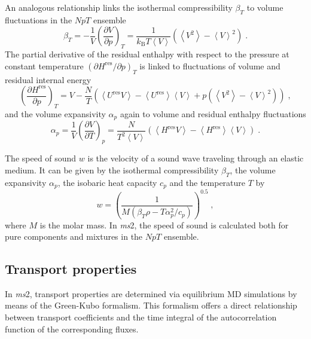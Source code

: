 An analogous relationship links the isothermal compressibility $\beta_{T}$ to volume fluctuations in the $NpT$ ensemble
\begin{equation}
\beta_{T}=-\frac{1}{V}\left(\frac{\partial V}{\partial p}\right)_{T}=\frac{1}{k_{\text{B}}T\left\langle V\right\rangle} \left(\left\langle V^{2}\right\rangle - \left\langle V\right\rangle ^{2}\right) \;.
\label{eq:isothermalcompressibility}
\end{equation}
The partial derivative of the residual enthalpy with respect to the pressure at constant temperature $(\partial H^{\text{res}}/ \partial p)_{T}$ is linked to fluctuations of volume and residual internal energy
\begin{equation}
\left(\frac{\partial H^{\text{res}}}{\partial p}\right)_{T}=V-\frac{N}{T}\left(\left\langle U^{\text{res}}V\right\rangle - \left\langle U^{\text{res}}\right\rangle\left\langle V\right\rangle+p\left(\left\langle V^{2}\right\rangle-\left\langle V\right\rangle ^{2}\right)\right) \;,
\label{eq:derivativeoftheresidualenthalpy}
\end{equation}
and the volume expansivity $\alpha_{p}$ again to volume and residual enthalpy fluctuations
\begin{equation}
\alpha_{p}=\frac{1}{V}\left(\frac{\partial V}{\partial T}\right)_{p}=\frac{N}{T^{2}\left\langle V\right\rangle}\left(\left\langle H^{\text{res}}V\right\rangle-\left\langle H^{\text{res}}\right\rangle\left\langle V\right\rangle\right) \;.
\label{eq:volumeexpansivity}
\end{equation}

The speed of sound $w$ is the velocity of a sound wave traveling through an elastic medium. It can be given by the isothermal compressibility $\beta_{T}$, the volume expansivity $\alpha_{p}$, the isobaric heat capacity $c_{p}$ and the temperature $T$ by
\begin{equation}
w=\left(\frac{1}{M\left(\beta_{T}\rho-T\alpha^{2}_{p}/c_{p}\right)}\right)^{0.5} \;,
\label{eq:speedofsound}
\end{equation}
where $M$ is the molar mass. In \textit{ms}2, the speed of sound is calculated both for pure components and mixtures in the $NpT$ ensemble.

\subsection{Transport properties}
\label{sec:Transport properties}



In \textit{ms}2, transport properties are determined via equilibrium MD simulations by means of the Green-Kubo formalism. This formalism offers a direct relationship between transport coefficients and the time integral of the autocorrelation function of the corresponding fluxes.

